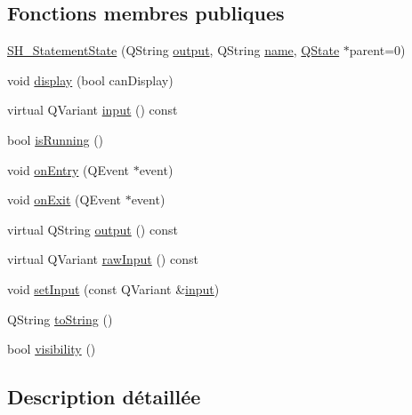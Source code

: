 \subsection*{Fonctions membres publiques}
\begin{DoxyCompactItemize}
\item 
\hyperlink{classSimpleHotel_1_1SH__StatementState_a0f3db02acd8f9d6bf509fe2ecdc4cf4f}{S\-H\-\_\-\-Statement\-State} (Q\-String \hyperlink{classSimpleHotel_1_1SH__InOutState_a71b15e4d49b9c2aa540500065ceb39da}{output}, Q\-String \hyperlink{classSimpleHotel_1_1SH__NamedObject_ad144716345034c91cface8f3163a799e}{name}, \hyperlink{classQState}{Q\-State} $\ast$parent=0)
\item 
void \hyperlink{classSimpleHotel_1_1SH__InOutState_a1cbe5befe4f42e0941165498ed0117a9}{display} (bool can\-Display)
\item 
virtual Q\-Variant \hyperlink{classSimpleHotel_1_1SH__InOutState_a487d2ca6200fed372b1a27cfa27774db}{input} () const 
\item 
bool \hyperlink{classSimpleHotel_1_1SH__GenericState_a5151ff071129bdd4dcf7c60cb93794da}{is\-Running} ()
\item 
void \hyperlink{classSimpleHotel_1_1SH__StatementState_a0b70f003ac6617fa2d3a43e07a3e4319}{on\-Entry} (Q\-Event $\ast$event)
\item 
void \hyperlink{classSimpleHotel_1_1SH__InOutState_aa5fc1b9281087bd8abcd6873d2a36009}{on\-Exit} (Q\-Event $\ast$event)
\item 
virtual Q\-String \hyperlink{classSimpleHotel_1_1SH__InOutState_a71b15e4d49b9c2aa540500065ceb39da}{output} () const 
\item 
virtual Q\-Variant \hyperlink{classSimpleHotel_1_1SH__InOutState_a5e8064672e20c7b13fec67a4955a3ce3}{raw\-Input} () const 
\item 
void \hyperlink{classSimpleHotel_1_1SH__StatementState_a72934f4802c1e403ad41f5a40b72156e}{set\-Input} (const Q\-Variant \&\hyperlink{classSimpleHotel_1_1SH__InOutState_a487d2ca6200fed372b1a27cfa27774db}{input})
\item 
Q\-String \hyperlink{classSimpleHotel_1_1SH__GenericState_adaded78178f9999a9e07a32871af5e61}{to\-String} ()
\item 
bool \hyperlink{classSimpleHotel_1_1SH__InOutState_a145a6e0e2c9e22971e35aa4538adeb4a}{visibility} ()
\end{DoxyCompactItemize}


\subsection{Description détaillée}


